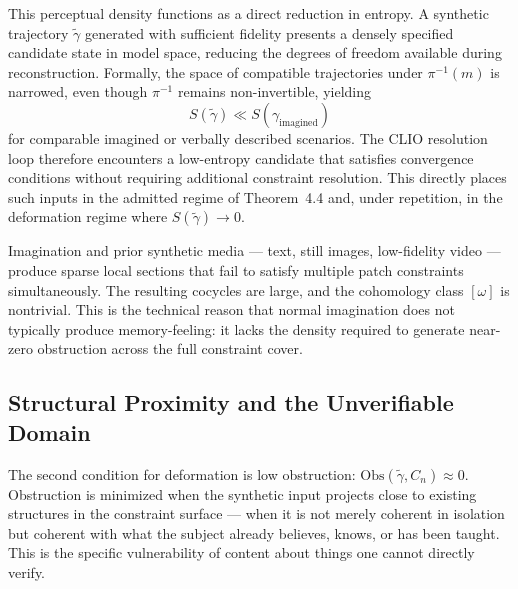 \documentclass[12pt, a4paper]{article}
\begin{document}
This perceptual density functions as a direct reduction in entropy. A synthetic trajectory $\tilde{\gamma}$ generated with sufficient fidelity presents a densely specified candidate state in model space, reducing the degrees of freedom available during reconstruction. Formally, the space of compatible trajectories under $\pi^{-1}(m)$ is narrowed, even though $\pi^{-1}$ remains non-invertible, yielding
\[
S(\tilde{\gamma}) \ll S(\gamma_{\text{imagined}})
\]
for comparable imagined or verbally described scenarios. The CLIO resolution loop therefore encounters a low-entropy candidate that satisfies convergence conditions without requiring additional constraint resolution. This directly places such inputs in the admitted regime of Theorem~4.4 and, under repetition, in the deformation regime where $S(\tilde{\gamma}) \rightarrow 0$.

Imagination and prior synthetic media --- text, still images, low-fidelity video --- produce sparse local sections that fail to satisfy multiple patch constraints simultaneously. The resulting cocycles are large, and the cohomology class $[\omega]$ is nontrivial. This is the technical reason that normal imagination does not typically produce memory-feeling: it lacks the density required to generate near-zero obstruction across the full constraint cover.

\subsection{Structural Proximity and the Unverifiable Domain}

The second condition for deformation is low obstruction: $\mathrm{Obs}(\tilde{\gamma}, C_n) \approx 0$. Obstruction is minimized when the synthetic input projects close to existing structures in the constraint surface — when it is not merely coherent in isolation but coherent with what the subject already believes, knows, or has been taught. This is the specific vulnerability of content about things one cannot directly verify.
\end{document}

